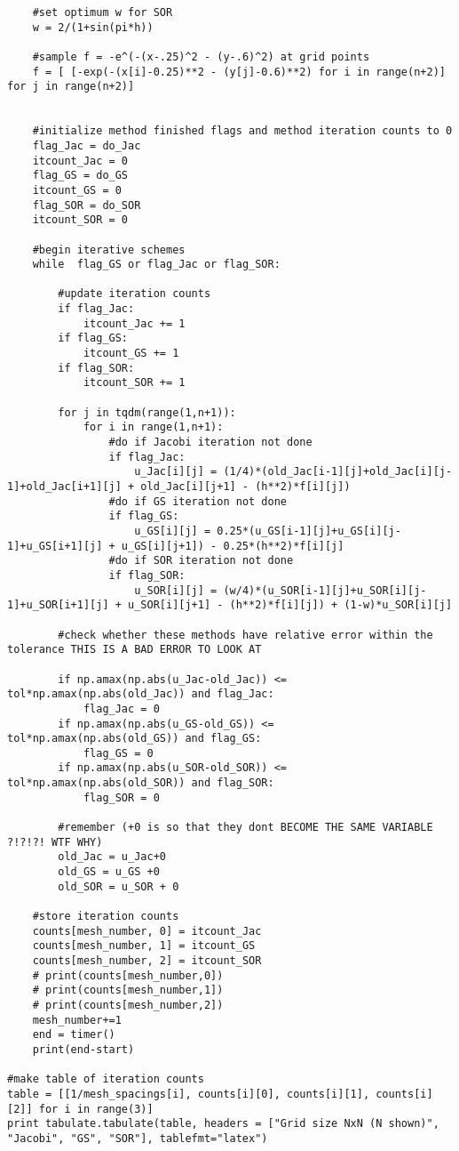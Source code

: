 \documentclass[12pt]{article}
\begin{document}
\begin{verbatim}
	#set optimum w for SOR
	w = 2/(1+sin(pi*h))

	#sample f = -e^(-(x-.25)^2 - (y-.6)^2) at grid points
	f = [ [-exp(-(x[i]-0.25)**2 - (y[j]-0.6)**2) for i in range(n+2)] for j in range(n+2)]
	

	#initialize method finished flags and method iteration counts to 0
	flag_Jac = do_Jac
	itcount_Jac = 0
	flag_GS = do_GS
	itcount_GS = 0
	flag_SOR = do_SOR
	itcount_SOR = 0

	#begin iterative schemes
	while  flag_GS or flag_Jac or flag_SOR:

		#update iteration counts
		if flag_Jac:
			itcount_Jac += 1
		if flag_GS:
			itcount_GS += 1
		if flag_SOR:
			itcount_SOR += 1

		for j in tqdm(range(1,n+1)):
			for i in range(1,n+1):
				#do if Jacobi iteration not done
				if flag_Jac:
					u_Jac[i][j] = (1/4)*(old_Jac[i-1][j]+old_Jac[i][j-1]+old_Jac[i+1][j] + old_Jac[i][j+1] - (h**2)*f[i][j])
				#do if GS iteration not done
				if flag_GS:
					u_GS[i][j] = 0.25*(u_GS[i-1][j]+u_GS[i][j-1]+u_GS[i+1][j] + u_GS[i][j+1]) - 0.25*(h**2)*f[i][j]
				#do if SOR iteration not done
				if flag_SOR:
					u_SOR[i][j] = (w/4)*(u_SOR[i-1][j]+u_SOR[i][j-1]+u_SOR[i+1][j] + u_SOR[i][j+1] - (h**2)*f[i][j]) + (1-w)*u_SOR[i][j]

		#check whether these methods have relative error within the tolerance THIS IS A BAD ERROR TO LOOK AT

		if np.amax(np.abs(u_Jac-old_Jac)) <=  tol*np.amax(np.abs(old_Jac)) and flag_Jac:
			flag_Jac = 0
		if np.amax(np.abs(u_GS-old_GS)) <=  tol*np.amax(np.abs(old_GS)) and flag_GS:
			flag_GS = 0			
		if np.amax(np.abs(u_SOR-old_SOR)) <= tol*np.amax(np.abs(old_SOR)) and flag_SOR:
			flag_SOR = 0

		#remember (+0 is so that they dont BECOME THE SAME VARIABLE ?!?!?! WTF WHY)
		old_Jac = u_Jac+0
		old_GS = u_GS +0
		old_SOR = u_SOR + 0

	#store iteration counts
	counts[mesh_number, 0] = itcount_Jac
	counts[mesh_number, 1] = itcount_GS
	counts[mesh_number, 2] = itcount_SOR
	# print(counts[mesh_number,0])
	# print(counts[mesh_number,1])
	# print(counts[mesh_number,2])
	mesh_number+=1
	end = timer()
	print(end-start)

#make table of iteration counts
table = [[1/mesh_spacings[i], counts[i][0], counts[i][1], counts[i][2]] for i in range(3)]
print tabulate.tabulate(table, headers = ["Grid size NxN (N shown)", "Jacobi", "GS", "SOR"], tablefmt="latex")

\end{verbatim}
\end{document}
